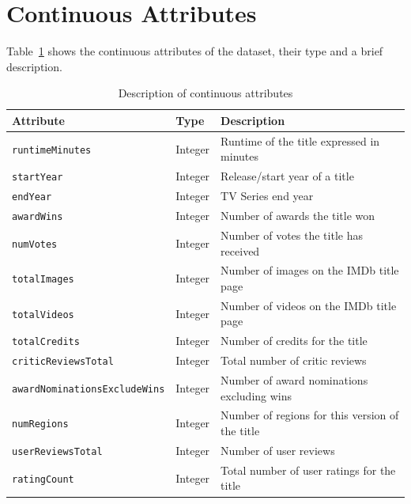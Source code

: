 \section{Continuous Attributes}
Table~\ref{tab:numerical_attributes} shows the continuous attributes of the dataset, their type and
a brief description.
\vspace{1em}
\begin{table}[H]
    \centering
    \begin{tabular}{lll}
        \toprule
        \textbf{Attribute} & \textbf{Type} & \textbf{Description} \\
        \midrule
        \texttt{runtimeMinutes} & Integer & Runtime of the title expressed in minutes \\
        \texttt{startYear} & Integer & Release/start year of a title \\
        \texttt{endYear} & Integer & TV Series end year \\
        \texttt{awardWins} & Integer & Number of awards the title won \\
        \texttt{numVotes} & Integer & Number of votes the title has received \\
        \texttt{totalImages} & Integer & Number of images on the IMDb title page \\
        \texttt{totalVideos} & Integer & Number of videos on the IMDb title page \\
        \texttt{totalCredits} & Integer & Number of credits for the title \\
        \texttt{criticReviewsTotal} & Integer & Total number of critic reviews \\
        \texttt{awardNominationsExcludeWins} & Integer & Number of award nominations excluding wins \\
        \texttt{numRegions} & Integer & Number of regions for this version of the title \\
        \texttt{userReviewsTotal} & Integer & Number of user reviews \\
        \texttt{ratingCount} & Integer & Total number of user ratings for the title \\
        \bottomrule
    \end{tabular}
    \caption{Description of continuous attributes}
    \label{tab:numerical_attributes}
\end{table}

